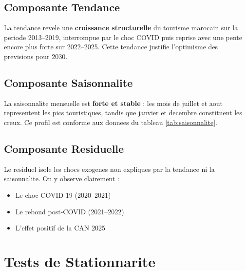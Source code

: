 \documentclass[12pt,a4paper]{report}
\begin{document}
\subsection{Composante Tendance}

La tendance revele une \textbf{croissance structurelle} du tourisme marocain
sur la periode 2013--2019, interrompue par le choc COVID puis reprise avec
une pente encore plus forte sur 2022--2025. Cette tendance justifie
l'optimisme des previsions pour 2030.

\subsection{Composante Saisonnalite}

La saisonnalite mensuelle est \textbf{forte et stable} : les mois de
juillet et aout representent les pics touristiques, tandis que janvier
et decembre constituent les creux. Ce profil est conforme aux donnees
du tableau \ref{tab:saisonnalite}.

\subsection{Composante Residuelle}

Le residuel isole les chocs exogenes non expliques par la tendance
ni la saisonnalite. On y observe clairement :
\begin{itemize}[leftmargin=1.5em,noitemsep]
  \item Le choc COVID-19 (2020--2021)
  \item Le rebond post-COVID (2021--2022)
  \item L'effet positif de la CAN 2025
\end{itemize}

\section{Tests de Stationnarite}
\end{document}
